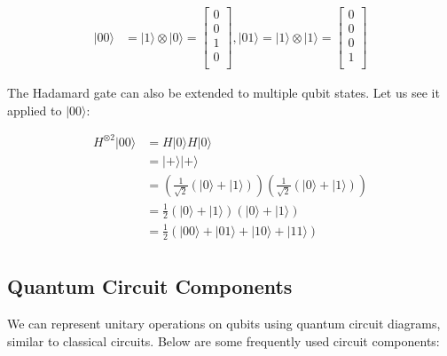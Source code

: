 \documentclass[msc,oneside]{ubcthesis}
\begin{document}
	\begin{align*}	
		|00\rangle &= |1\rangle \otimes |0\rangle = \begin{bmatrix}
			0 \\
			0 \\
			1 \\
			0 \\
		\end{bmatrix}, 
		|01\rangle = |1\rangle \otimes |1\rangle = \begin{bmatrix}
			0 \\
			0 \\
			0 \\
			1 \\
		\end{bmatrix}		
	\end{align*}
	
 The Hadamard gate can also be extended to multiple qubit states. Let us see it applied to $|00\rangle$:
	
	\begin{align*}	
		H^{\otimes 2}|00\rangle &= H|0\rangle H|0\rangle\\
		&= |+\rangle|+\rangle\\
		&= (\frac{1}{\sqrt{2}} (|0\rangle + |1\rangle))(\frac{1}{\sqrt{2}} (|0\rangle + |1\rangle))\\
		&= \frac{1}{2} (|0\rangle + |1\rangle)(|0\rangle + |1\rangle)\\
		&= \frac{1}{2} (|00\rangle + |01\rangle + |10\rangle + |11\rangle)\\
	\end{align*}
	
	\subsection{Quantum Circuit Components}
	
	We can represent unitary operations on qubits using quantum circuit diagrams, similar to classical circuits. Below are some frequently used circuit components:
	
\end{document}
